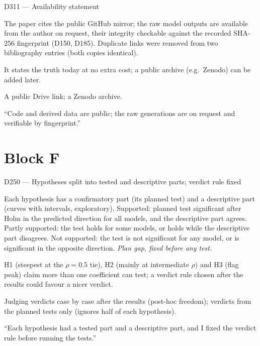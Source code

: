 \documentclass[11pt,a4paper]{report}
\begin{document}
\begin{decisionbox}{D311 --- Availability statement}
\begin{description}[nosep, leftmargin=0pt]
  \item[Decision.] The paper cites the public GitHub mirror; the raw model outputs are available from the author on request, their integrity checkable against the recorded SHA-256 fingerprint (D150, D185). Duplicate links were removed from two bibliography entries (both copies identical).
  \item[Why.] It states the truth today at no extra cost; a public archive (e.g.\ Zenodo) can be added later.
  \item[Alternatives.] A public Drive link; a Zenodo archive.
  \item[Interview line.] ``Code and derived data are public; the raw generations are on request and verifiable by fingerprint.''
\end{description}
\end{decisionbox}


\section{Block F}\label{sec:decisions-f}

\begin{decisionbox}{D250 --- Hypotheses split into tested and descriptive parts; verdict rule fixed}
\begin{description}[nosep, leftmargin=0pt]
  \item[Decision.] Each hypothesis has a confirmatory part (its planned test) and a descriptive part (curves with intervals, exploratory). Supported: planned test significant after Holm in the predicted direction for all models, and the descriptive part agrees. Partly supported: the test holds for some models, or holds while the descriptive part disagrees. Not supported: the test is not significant for any model, or is significant in the opposite direction. \emph{Plan gap, fixed before any test.}
  \item[Why.] H1 (steepest at the $\rho=0.5$ tie), H2 (mainly at intermediate $\rho$) and H3 (flag peak) claim more than one coefficient can test; a verdict rule chosen after the results could favour a nicer verdict.
  \item[Alternatives.] Judging verdicts case by case after the results (post-hoc freedom); verdicts from the planned tests only (ignores half of each hypothesis).
  \item[Interview line.] ``Each hypothesis had a tested part and a descriptive part, and I fixed the verdict rule before running the tests.''
\end{description}
\end{decisionbox}
\end{document}
